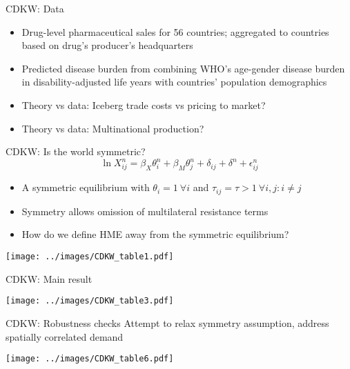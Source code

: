 \documentclass[11pt,notes=hide,aspectratio=169]{beamer}
\begin{document}
\begin{frame}{CDKW: Data}
\begin{itemize}
	\item Drug-level pharmaceutical sales for 56 countries; aggregated to countries based on drug's producer's headquarters
	\item Predicted disease burden from combining WHO's age-gender disease burden in disability-adjusted life years with countries' population demographics
	\item Theory vs data: Iceberg trade costs vs pricing to market?
	\item Theory vs data: Multinational production?
\end{itemize}
\end{frame}
\begin{frame}{CDKW: Is the world symmetric?}
\vspace{-3mm}
\begin{equation*}
	\ln X_{ij}^n = \beta_X \theta_i^n + \beta_M \theta_j^n +  \delta_{ij} + \delta^n + \epsilon_{ij}^n
\end{equation*}
\vspace{-5mm}
\begin{itemize}
	\item A symmetric equilibrium with $\theta_i = 1 \ \forall i$ and $\tau_{ij} = \tau > 1 \ \forall i,j:i \neq j$
	\item Symmetry allows omission of multilateral resistance terms
	\item How do we define HME away from the symmetric equilibrium?
\end{itemize}
\begin{center}\texttt{[image: ../images/CDKW\_table1.pdf]}\end{center}
\end{frame}
\begin{frame}{CDKW: Main result}
\begin{center}\texttt{[image: ../images/CDKW\_table3.pdf]}\end{center}
\end{frame}
\begin{frame}{CDKW: Robustness checks}
Attempt to relax symmetry assumption, address spatially correlated demand
\begin{center}\texttt{[image: ../images/CDKW\_table6.pdf]}\end{center}
\end{frame}
\end{document}
